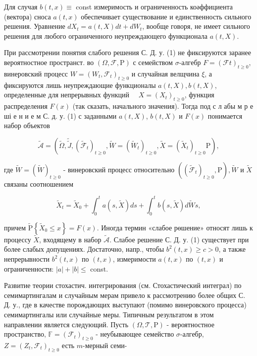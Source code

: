 \documentclass[10pt]{article}
\begin{document}
Для случая $b(t, x) \equiv$ const измеримость и ограниченность коәффициента (вектора) сноса $a(t, x)$ обеспечивает существование и единственность сильного решения. Уравнение $d X_{t}=a(t, X) d t+d W_{t}$, вообще говоря, не имеет сильного решения для любого ограниченного неупреждающего функционала $a(t, X)$.



При рассмотрении понятия слабого решения С. Д. у. (1) не фиксируются заранее вероятностное пространст. во $(\Omega, \mathscr{F}, \mathrm{P})$ с семейством $\sigma$-алгебр $F=(\mathscr{F} t)_{t \geqslant 0}$, винеровский процесс $W=\left(W_{t}, \mathscr{F}_{t}\right)_{t \geqslant 0}$ и случайная велщчина $\xi$, а фиксируются лишь неупреждающие функционалы $a(t, X), b(t, X)$, определенные для непрерывных функций $\quad X=\left(X_{t}\right)_{t \geqslant 0}$, функция распределения $F(x)$ (так сказать, начального значения). Тогда под с л абы м р е ші е н и е м С. д. у. (1) с заданными $a(t, X)$, $b(t, X)$ и $F(x)$ понимается набор объектов



\[

\tilde{\mathcal{A}}=\left(\tilde{\Omega}, \tilde{\tilde{J}},\left(\tilde{\mathscr{F}}_{t}\right)_{t \geqslant 0}, \tilde{W}=\left(\tilde{W}_{t}\right)_{t \geqslant 0}, \tilde{X}=\left(\tilde{X}_{t}\right)_{t \geqslant 0} \mathrm{P}\right),

\]



где $\tilde{W}=(\tilde{W})_{t \geqslant 0}$ - винеровский процесс относительно $\left(\left(\tilde{\mathscr{F}}_{t}\right)_{t \geqslant 0}, \mathrm{P}\right), \tilde{W}$ и $\tilde{X}$ связаны соотношением



\[

\tilde{X}_{t}=\tilde{X}_{0}+\int_{0}^{t} a(s, \tilde{X}) d s+\int_{0}^{t} b(s, \tilde{X}) d \tilde{W} s,

\]



причем $\tilde{\mathrm{P}}\left\{\tilde{X}_{0} \leqslant x\right\}=F(x)$. Иногда термин «слабое рөшение» относят лишь к процессу $\tilde{X}$, входящему в набор $\tilde{\mathcal{A}}$. Слабое решение С. Д. у. (1) существует при более слабых допущениях. Достаточно, напр., чтобы $b^{2}(t, x) \geqslant c>0$, а также непрерывности $b^{2}(t, x)$ по $(t, x)$, измеримости $a(t, x)$ по $(t, x)$ и ограниченности: $|a|+|b| \leqslant$ const.



Развитие теории стохастич. интегрирования (см. Стохастический интеграл) по семимартингалам и случайным мерам привело к рассмотрению более общих С. Д. у., где в качестве порождающих выступают (помимо винеровского процесса) семимартингалы или случайные меры. Типичным результатом в этом направлении является следующий. Пусть $(\Omega, \mathscr{T}, \mathrm{P})$ - вероятностное пространство, $\mathbb{F}=\left(\mathscr{F}_{t}\right)_{t \geqslant 0}$ - неубывающее семейство $\sigma$-алгебр, $Z=\left(Z_{t}, \mathscr{F}_{t}\right)_{t \geqslant 0}$ есть $m$-мерный семи-
\end{document}
